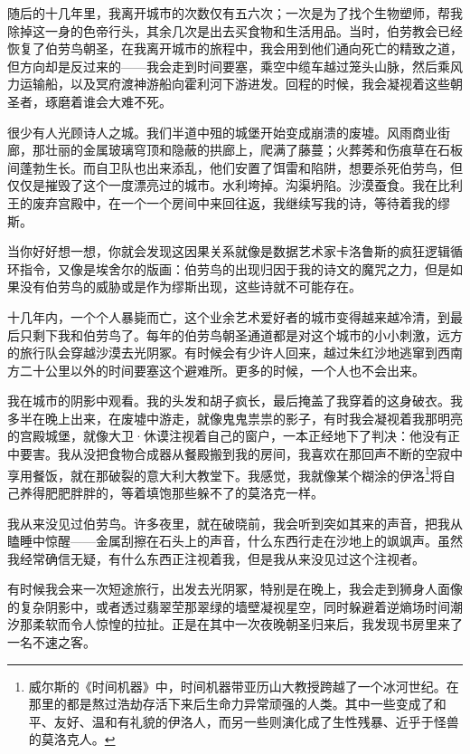 \documentclass[AutoFakeBold=true]{book}
\begin{document}
随后的十几年里，我离开城市的次数仅有五六次；一次是为了找个生物塑师，帮我除掉这一身的色帝行头，其余几次是出去买食物和生活用品。当时，伯劳教会已经恢复了伯劳鸟朝圣，在我离开城市的旅程中，我会用到他们通向死亡的精致之道，但方向却是反过来的——我会走到时间要塞，乘空中缆车越过笼头山脉，然后乘风力运输船，以及冥府渡神游船向霍利河下游进发。回程的时候，我会凝视着这些朝圣者，琢磨着谁会大难不死。

很少有人光顾诗人之城。我们半道中殂的城堡开始变成崩溃的废墟。风雨商业街廊，那壮丽的金属玻璃穹顶和隐蔽的拱廊上，爬满了藤蔓；火葬莠和伤痕草在石板间蓬勃生长。而自卫队也出来添乱，他们安置了饵雷和陷阱，想要杀死伯劳鸟，但仅仅是摧毁了这个一度漂亮过的城市。水利垮掉。沟渠坍陷。沙漠蚕食。我在比利王的废弃宫殿中，在一个一个房间中来回往返，我继续写我的诗，等待着我的缪斯。

\vspace*{1em}

当你好好想一想，你就会发现这因果关系就像是数据艺术家卡洛鲁斯的疯狂逻辑循环指令，又像是埃舍尔的版画：伯劳鸟的出现归因于我的诗文的魔咒之力，但是如果没有伯劳鸟的威胁或是作为缪斯出现，这些诗就不可能存在。

十几年内，一个个人暴毙而亡，这个业余艺术爱好者的城市变得越来越冷清，到最后只剩下我和伯劳鸟了。每年的伯劳鸟朝圣通道都是对这个城市的小小刺激，远方的旅行队会穿越沙漠去光阴冢。有时候会有少许人回来，越过朱红沙地逃窜到西南方二十公里以外的时间要塞这个避难所。更多的时候，一个人也不会出来。

我在城市的阴影中观看。我的头发和胡子疯长，最后掩盖了我穿着的这身破衣。我多半在晚上出来，在废墟中游走，就像鬼鬼祟祟的影子，有时我会凝视着我那明亮的宫殿城堡，就像大卫·休谟注视着自己的窗户，一本正经地下了判决：他没有正中要害。我从没把食物合成器从餐殿搬到我的房间，我喜欢在那回声不断的空寂中享用餐饭，就在那破裂的意大利大教堂下。我感觉，我就像某个糊涂的伊洛\footnote{威尔斯的《时间机器》中，时间机器带亚历山大教授跨越了一个冰河世纪。在那里的都是熬过浩劫存活下来后生命力异常顽强的人类。其中一些变成了和平、友好、温和有礼貌的伊洛人，而另一些则演化成了生性残暴、近乎于怪兽的莫洛克人。}将自己养得肥肥胖胖的，等着填饱那些躲不了的莫洛克一样。

我从来没见过伯劳鸟。许多夜里，就在破晓前，我会听到突如其来的声音，把我从瞌睡中惊醒——金属刮擦在石头上的声音，什么东西行走在沙地上的飒飒声。虽然我经常确信无疑，有什么东西正注视着我，但是我从来没见过这个注视者。

有时候我会来一次短途旅行，出发去光阴冢，特别是在晚上，我会走到狮身人面像的复杂阴影中，或者透过翡翠茔那翠绿的墙壁凝视星空，同时躲避着逆熵场时间潮汐那柔软而令人惊惶的拉扯。正是在其中一次夜晚朝圣归来后，我发现书房里来了一名不速之客。
\end{document}
